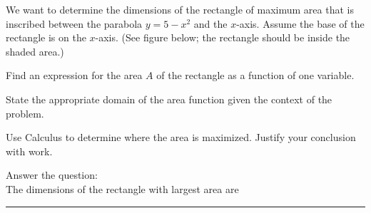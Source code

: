 \documentclass[12pt]{article}
\renewcommand{\emph}[1]{\textsf{\textbf{#1}}}
\newcommand{\blank}[1]{\rule{#1}{0.75pt}}
\newcounter{probcount}
\newcounter{subprobcount}
\def\problem#1{\setcounter{subprobcount}{0}%
\addtocounter{probcount}{1}{\emph{\arabic{probcount}.\hskip 1em(#1)}}\par}
\newenvironment{subproblems}{%
\begin{enumerate}%
\setcounter{enumi}{\value{subprobcount}}%
\renewcommand{\theenumi}{\emph{\alph{enumi}}}}%
{\setcounter{subprobcount}{\value{enumi}}\end{enumerate}}
\begin{document}




\problem{12 points} 
\def\xx{1}
\def\off{.3}
\def\yy{5} %
We want to determine the dimensions of the rectangle of maximum area that is inscribed between the parabola $y=\yy-x^2$ and the $x$-axis. Assume the base of the rectangle is on the $x$-axis. (See figure below; the rectangle should be inside the shaded area.) 

	\begin{subproblems}
	
%
%
\begin{minipage}[c]{.5\textwidth}
\end{minipage}
%
\begin{minipage}{.4\linewidth}
	\item Find an expression for the area $A$ of the rectangle as a function of one variable.

\bigskip
\vspace{1in}
	\item State the appropriate domain of the area function given the context of the problem.
	
		\vspace{1.5cm}

\end{minipage}


	\item Use Calculus to determine where the area is maximized. Justify your conclusion with work.
	\vfill
	\item Answer the question: \\
	The dimensions of the rectangle with largest area are \: \blank{6cm}
	\end{subproblems}
\end{document}
